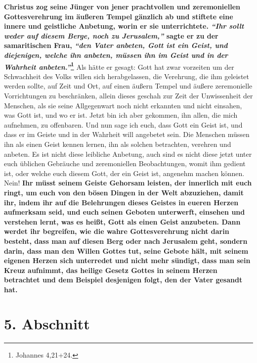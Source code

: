 \textbf{Christus zog seine Jünger von jener prachtvollen und zeremoniellen
Gottesverehrung im äußeren Tempel gänzlich ab und stiftete eine innere und
geistliche Anbetung, worin er sie unterrichtete.
\textit{"`Ihr sollt weder auf diesem Berge, noch zu Jerusalem,"'}
sagte er zu der samaritischen Frau,
\textit{"`den Vater anbeten, Gott ist ein Geist, und diejenigen, welche ihn
anbeten, müssen ihn im Geist und in der Wahrheit anbeten."'}\footnote{Johannes
4,21+24.}
}
Als hätte er
gesagt: Gott hat zwar vorzeiten um der Schwachheit des Volks willen sich
herabgelassen, die Verehrung, die ihm geleistet werden sollte, auf Zeit und Ort,
auf einen äußern Tempel und äußere zeremonielle Vorrichtungen zu beschränken,
allein dieses geschah zur Zeit der Unwissenheit der Menschen, als sie seine
Allgegenwart noch nicht erkannten und nicht einsahen, was Gott ist, und wo er
ist. Jetzt bin ich aber gekommen, ihn allen, die mich aufnehmen, zu offenbaren.
Und nun sage ich euch, dass Gott ein Geist ist, und dass er im Geiste und in der
Wahrheit will angebetet sein. Die Menschen müssen ihn als einen Geist kennen
lernen, ihn als solchen betrachten, verehren und anbeten. Es ist nicht diese
leibliche Anbetung, auch sind es nicht diese
jetzt unter euch üblichen Gebräuche
und zeremoniellen Beobachtungen, womit ihm gedient ist, oder welche euch diesem
Gott, der ein Geist ist, angenehm machen können. Nein!
\label{ref:05_04_wahre_anbetung}
\textbf{Ihr müsst seinem Geiste
Gehorsam leisten, der innerlich mit euch ringt, um
euch von den bösen Dingen in
der Welt abzuziehen, damit ihr, indem ihr auf die Belehrungen dieses Geistes in
eueren Herzen aufmerksam seid, und euch seinen Geboten unterwerft, einsehen und
verstehen lernt, was es heißt, Gott als einen Geist anzubeten. Dann werdet ihr
begreifen, wie die wahre Gottesverehrung nicht darin besteht, dass man auf
diesen Berg oder nach Jerusalem geht, sondern darin, dass man den Willen Gottes
tut, seine Gebote hält, mit seinem eigenen Herzen sich unterredet und nicht
mehr sündigt, dass man sein Kreuz aufnimmt, das heilige Gesetz Gottes in seinem
Herzen betrachtet und dem Beispiel desjenigen folgt, den der Vater gesandt
hat.}

\section{5. Abschnitt} \label{kap5_ab5}

